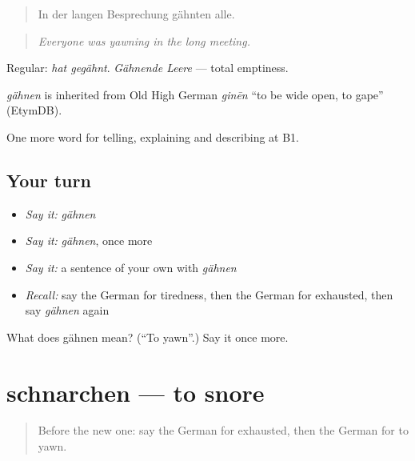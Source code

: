 \begin{quote}
In der langen Besprechung gähnten alle.
\end{quote}

\begin{quote}
\emph{Everyone was yawning in the long meeting.}
\end{quote}

Regular: \emph{hat gegähnt}. \emph{Gähnende Leere} — total emptiness.

\begin{cousinweb}
\emph{gähnen} is inherited from Old High German \emph{ginēn} \textquotedblleft{}to be wide open, to gape\textquotedblright{} (EtymDB).
\end{cousinweb}

\begin{grammarlens}[title={What you've built}]
One more word for telling, explaining and describing at B1.
\end{grammarlens}

\subsection*{Your turn}
\begin{itemize}
\raggedright
  \item \emph{Say it:} \emph{gähnen}
  \item \emph{Say it:} \emph{gähnen}, once more
  \item \emph{Say it:} a sentence of your own with \emph{gähnen}
  \item \emph{Recall:} say the German for tiredness, then the German for exhausted, then say \emph{gähnen} again
\end{itemize}

\begin{tcolorbox}[breakable,colback=teal!4,colframe=teal!35!black,title={Before you move on}]
What does gähnen mean? (\textquotedblleft{}To yawn\textquotedblright{}.) Say it once more.
\end{tcolorbox}
\section[schnarchen]{schnarchen — to snore}

\label{lesson:GE-C486-schnarchen}



\begin{quote}
Before the new one: say the German for exhausted, then the German for to yawn.
\end{quote}

